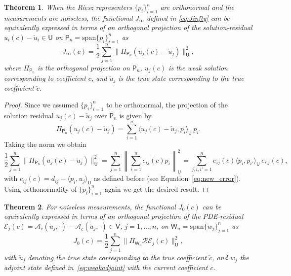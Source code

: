 \documentclass[12pt]{amsart}
\newtheorem{thm}{Theorem}
\begin{document}
\begin{thm}
When the Riesz representers $\{p_i\}_{i=1}^n$ are orthonormal and the measurements are noiseless, the functional $J_\infty$ defined in \eqref{eq:Jinfty} can be equivalently expressed in terms of an orthogonal projection of the solution-residual $u_i(c) - \check{u}_i \in \mathsf{U}$ on $\mathsf{P}_n = \text{span}\{p_i\}_{i=1}^n$ as
\[
J_{\infty}(c) = {\textstyle\frac{1}{2}}\sum_{j=1}^n\|\Pi_{\mathsf{P}_n}(u_j(c) - \check{u}_j)\|_{\mathsf{U}}^2,
\]
where $\Pi_{\mathsf{P}_n}$ is the orthogonal projection on $\mathsf{P}_n$, $u_j(c)$ is the weak solution corresponding to coefficient $c$, and $\check{u}_j$ is the true state corresponding to the true coefficient $\check{c}$.
\end{thm}
\begin{proof}
Since we assumed $\{p_i\}_{i=1}^n$ to be orthonormal, the projection of the solution residual $u_j(c) - \check{u}_j$ over $\mathsf{P}_n $ is given by 
\[
\Pi_{\mathsf{P}_n}(u_j(c) - \check{u}_j) = \sum_{i=1}^n \langle u_j(c) - \check{u}_j,p_i\rangle_{\mathsf{U}}\,p_i.
\]
Taking the norm we obtain
\[
{\textstyle\frac{1}{2}}\sum_{j=1}^n\|\Pi_{\mathsf{P}_n}(u_j(c) - \check{u}_j)\|_{\mathsf{U}}^2 = \sum_{j=1}^n \left\|\sum_{i=1}^n \overline{e_{ij}(c)}p_i\right\|_{\mathsf{U}}^2 = \sum_{j,i,i'=1}^n \overline{e_{ij}(c)}\langle p_i,p_{i'}\rangle_\mathsf{U}\, {e_{i'j}(c)},
\]
with $e_{ij}(c) = d_{ij} - \langle p_i, u_j\rangle_{\mathsf{U}}$ as defined before (see Equation~\eqref{eq:new_error}).
Using orthonormality of $\{p_i\}_{i=1}^n$ again we get the desired result.
\end{proof}
\begin{thm}
For noiseless measurements, the functional $J_0(c)$ can be equivalently expressed in terms of an orthogonal projection of the PDE-residual $\mathcal{E}_j(c) = \mathcal{A}_c(\check{u}_j,\cdot) -  \mathcal{A}_{\check{c}}(\check{u}_j,\cdot) \in \mathsf{V}$, $j=1,\ldots,n$, on $\mathsf{W}_n = \text{span}\{w_j\}_{j=1}^n$ as
\[
J_0(c) = {\textstyle\frac{1}{2}}\sum_{j=1}^n \|\Pi_{\mathsf{W}_n}\mathcal{R}\mathcal{E}_j(c)\|_{\mathsf{U}}^2,
\]
with $\check{u}_j$ denoting the true state corresponding to the true coefficient $\check{c}$, and $w_j$ the adjoint state defined in~\eqref{eq:weakadjoint} with the current coefficient $c$.
\end{thm}
\end{document}
